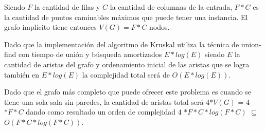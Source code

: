 Siendo $F$ la cantidad de filas y $C$ la cantidad de columnas de la entrada, $F \ast C$ es la cantidad de puntos caminables máximos que puede tener una instancia. El grafo impl\'icito tiene entonces $V(G) = F \ast C $ nodos.

Dado que la implementación del algoritmo de Kruskal utiliza la técnica de union-find con tiempo de uni\'on y b\'usqueda amortizados $E \ast log(E)$ siendo $E$ la cantidad de aristas del grafo y  ordenamiento inicial de las aristas que se logra tambi\'en en $E \ast log(E)$ la complejidad total será de $O(E \ast log(E))$.

Dado que el grafo más completo que puede ofrecer este problema es cuando se tiene una sola sala sin paredes, la cantidad de aristas total será 4$\ast  V(G)$ = 4$\ast  F \ast C$ dando como resultado un orden de complejidad 4 $\ast F \ast C \ast log(F \ast C)$ $\subseteq$ $O(F \ast C \ast log(F \ast C))$.
